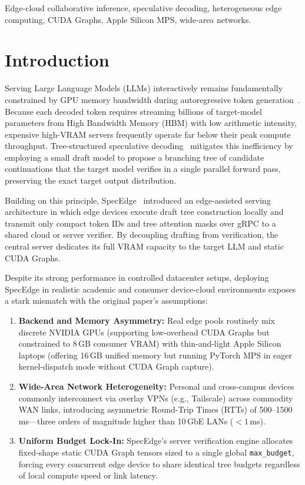 \documentclass[10pt,conference]{IEEEtran}
\begin{document}
\begin{IEEEkeywords}
Edge-cloud collaborative inference, speculative decoding, heterogeneous edge computing, CUDA Graphs, Apple Silicon MPS, wide-area networks.
\end{IEEEkeywords}

\section{Introduction}

Serving Large Language Models (LLMs) interactively remains fundamentally constrained by GPU memory bandwidth during autoregressive token generation~\cite{leviathan2023spec}. Because each decoded token requires streaming billions of target-model parameters from High Bandwidth Memory (HBM) with low arithmetic intensity, expensive high-VRAM servers frequently operate far below their peak compute throughput. Tree-structured speculative decoding~\cite{svirschevski2024specexec} mitigates this inefficiency by employing a small draft model to propose a branching tree of candidate continuations that the target model verifies in a single parallel forward pass, preserving the exact target output distribution.

Building on this principle, SpecEdge~\cite{park2025specedge} introduced an edge-assisted serving architecture in which edge devices execute draft tree construction locally and transmit only compact token IDs and tree attention masks over gRPC to a shared cloud or server verifier. By decoupling drafting from verification, the central server dedicates its full VRAM capacity to the target LLM and static CUDA Graphs.

Despite its strong performance in controlled datacenter setups, deploying SpecEdge in realistic academic and consumer device-cloud environments exposes a stark mismatch with the original paper's assumptions:
\begin{enumerate}
  \item \textbf{Backend and Memory Asymmetry:} Real edge pools routinely mix discrete NVIDIA GPUs (supporting low-overhead CUDA Graphs but constrained to 8\,GB consumer VRAM) with thin-and-light Apple Silicon laptops (offering 16\,GB unified memory but running PyTorch MPS in eager kernel-dispatch mode without CUDA Graph capture).
  \item \textbf{Wide-Area Network Heterogeneity:} Personal and cross-campus devices commonly interconnect via overlay VPNs (e.g., Tailscale) across commodity WAN links, introducing asymmetric Round-Trip Times (RTTs) of 500--1500\,ms---three orders of magnitude higher than 10\,GbE LANs ($<1$\,ms).
  \item \textbf{Uniform Budget Lock-In:} SpecEdge's server verification engine allocates fixed-shape static CUDA Graph tensors sized to a single global \texttt{max\_budget}, forcing every concurrent edge device to share identical tree budgets regardless of local compute speed or link latency.
\end{enumerate}
\end{document}
